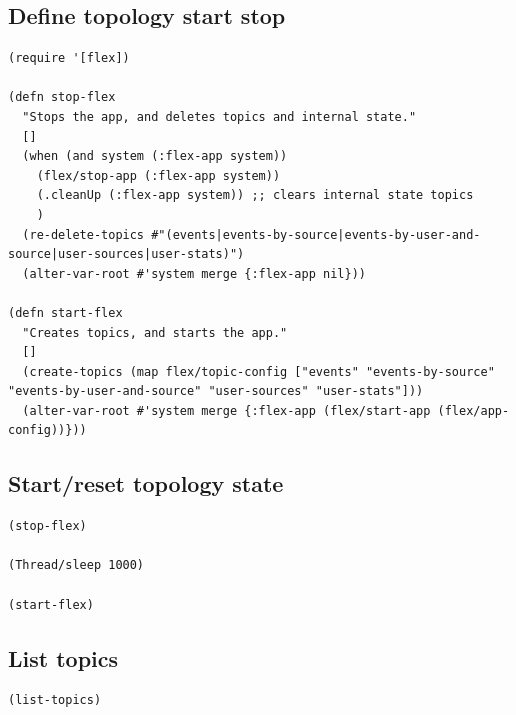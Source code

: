 \documentclass[11pt]{article}
\begin{document}
\subsection{Define topology start stop}
\label{sec:orgfc37134}
\begin{verbatim}
(require '[flex])

(defn stop-flex
  "Stops the app, and deletes topics and internal state."
  []
  (when (and system (:flex-app system))
    (flex/stop-app (:flex-app system))
    (.cleanUp (:flex-app system)) ;; clears internal state topics
    )
  (re-delete-topics #"(events|events-by-source|events-by-user-and-source|user-sources|user-stats)")
  (alter-var-root #'system merge {:flex-app nil}))

(defn start-flex
  "Creates topics, and starts the app."
  []
  (create-topics (map flex/topic-config ["events" "events-by-source" "events-by-user-and-source" "user-sources" "user-stats"]))
  (alter-var-root #'system merge {:flex-app (flex/start-app (flex/app-config))}))
\end{verbatim}

\subsection{Start/reset topology state}
\label{sec:orgabd90e8}
\begin{verbatim}
(stop-flex)

(Thread/sleep 1000)

(start-flex)
\end{verbatim}

\subsection{List topics}
\label{sec:org6d9a8e9}
\begin{verbatim}
(list-topics)
\end{verbatim}
\end{document}
